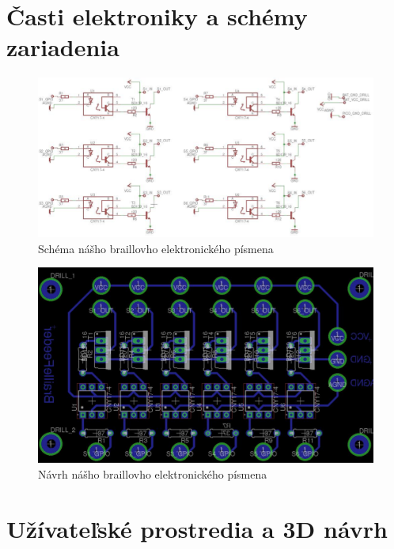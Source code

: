 \documentclass{template/socthesis}
\begin{document}
\begin{appendices}
	\chapter{Časti elektroniky a schémy zariadenia}
	
	\begin{center}
		\begin{figure}[h]
			\centering
			\includegraphics[width=\textwidth,height=\textheight,keepaspectratio]{scheme}
			\caption{Schéma nášho braillovho elektronického písmena}
		\end{figure}
	\end{center}

	\begin{center}
		\begin{figure}[h]
			\centering
			\includegraphics[width=\textwidth,height=\textheight,keepaspectratio]{board}
			\caption{Návrh nášho braillovho elektronického písmena}
		\end{figure}
	\end{center}

	\chapter{Užívateľské prostredia a 3D návrh}
	

\end{appendices}
 
\end{document}
